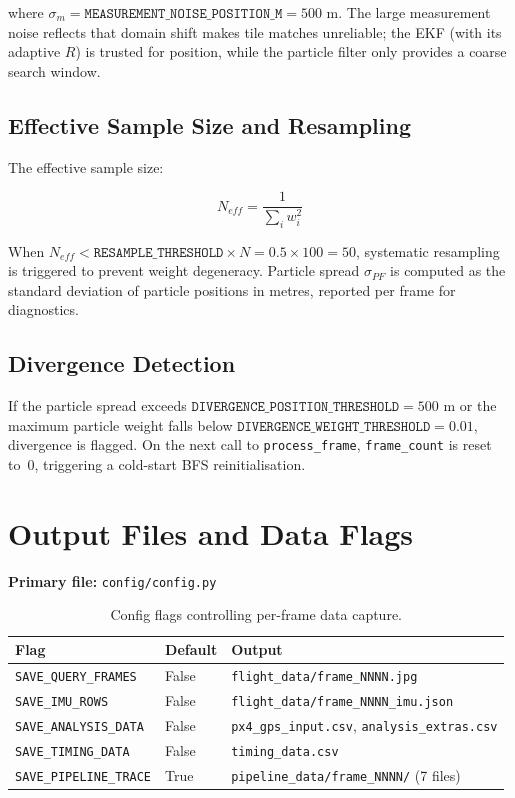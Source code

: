 \documentclass[12pt,a4paper]{article}
\begin{document}
where $\sigma_m = \texttt{MEASUREMENT\_NOISE\_POSITION\_M} = 500$ m. The large
measurement noise reflects that domain shift makes tile matches unreliable;
the EKF (with its adaptive $R$) is trusted for position, while the particle
filter only provides a coarse search window.

\subsection{Effective Sample Size and Resampling}

The effective sample size:

\begin{equation}
    N_{eff} = \frac{1}{\sum_i w_i^2}
    \label{eq:neff}
\end{equation}

When $N_{eff} < \texttt{RESAMPLE\_THRESHOLD} \times N = 0.5 \times 100 = 50$,
systematic resampling is triggered to prevent weight degeneracy. Particle
spread $\sigma_{PF}$ is computed as the standard deviation of particle
positions in metres, reported per frame for diagnostics.

\subsection{Divergence Detection}

If the particle spread exceeds $\texttt{DIVERGENCE\_POSITION\_THRESHOLD} = 500$ m
or the maximum particle weight falls below $\texttt{DIVERGENCE\_WEIGHT\_THRESHOLD} = 0.01$,
divergence is flagged. On the next call to \texttt{process\_frame},
\texttt{frame\_count} is reset to~0, triggering a cold-start BFS reinitialisation.

\section{Output Files and Data Flags}

\noindent\textbf{Primary file:} \texttt{config/config.py}

\begin{table}[H]
\centering
\begin{tabular}{@{}lll@{}}
\toprule
\textbf{Flag} & \textbf{Default} & \textbf{Output} \\
\midrule
\texttt{SAVE\_QUERY\_FRAMES} & False & \texttt{flight\_data/frame\_NNNN.jpg} \\
\texttt{SAVE\_IMU\_ROWS} & False & \texttt{flight\_data/frame\_NNNN\_imu.json} \\
\texttt{SAVE\_ANALYSIS\_DATA} & False & \texttt{px4\_gps\_input.csv}, \texttt{analysis\_extras.csv} \\
\texttt{SAVE\_TIMING\_DATA} & False & \texttt{timing\_data.csv} \\
\texttt{SAVE\_PIPELINE\_TRACE} & True & \texttt{pipeline\_data/frame\_NNNN/} (7 files) \\
\bottomrule
\end{tabular}
\caption{Config flags controlling per-frame data capture.}
\end{table}
\end{document}
